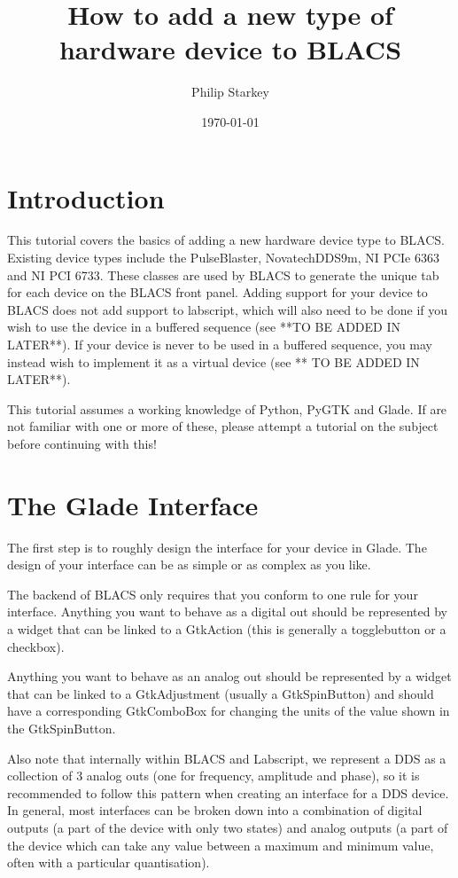 \documentclass[12pt]{article}
\begin{document}
\title{How to add a new type of hardware device to BLACS}
\author{Philip Starkey}
\date{\today}
\maketitle
{}
\section{Introduction}
This tutorial covers the basics of adding a new hardware device type to BLACS. Existing device types include the PulseBlaster, NovatechDDS9m, NI PCIe 6363 and NI PCI 6733. These classes are used by BLACS to generate the unique tab for each device on the BLACS front panel. Adding support for your device to BLACS does not add support to labscript, which will also need to be done if you wish to use the device in a buffered sequence (see **TO BE ADDED IN LATER**). If your device is never to be used in a buffered sequence, you may instead wish to implement it as a virtual device (see ** TO BE ADDED IN LATER**).

This tutorial assumes a working knowledge of Python, PyGTK and Glade. If are not familiar with one or more of these, please attempt a tutorial on the subject before continuing with this!

\section{The Glade Interface}\label{glade interface}
The first step is to roughly design the interface for your device in Glade. The design of your interface can be as simple or as complex as you like. 

The backend of BLACS only requires that you conform to one rule for your interface. Anything you want to behave as a digital out should be represented by a widget that can be linked to a GtkAction (this is generally a togglebutton or a checkbox).

Anything you want to behave as an analog out should be represented by a widget that can be linked to a GtkAdjustment (usually a GtkSpinButton) and should have a corresponding GtkComboBox for changing the units of the value shown in the GtkSpinButton.

Also note that internally within BLACS and Labscript, we represent a DDS as a collection of 3 analog outs (one for frequency, amplitude and phase), so it is recommended to follow this pattern when creating an interface for a DDS device. In general, most interfaces can be broken down into a combination of digital outputs (a part of the device with only two states) and analog outputs (a part of the device which can take any value between a maximum and minimum value, often with a particular quantisation).
\end{document}

